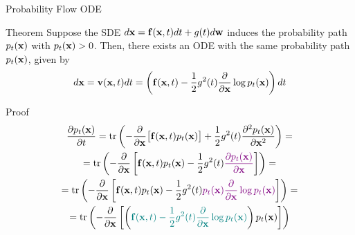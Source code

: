 \documentclass{beamer}
\renewcommand{\nextonslide}[1]{#1}
\begin{document}
\begin{frame}{Probability Flow ODE}
	\vspace{-0.3cm}
	\begin{block}{Theorem}
		Suppose the SDE $d\mathbf{x} = \mathbf{f}(\mathbf{x}, t) dt + g(t) d \mathbf{w}$ induces the probability path $p_t(\mathbf{x})$ with $p_t(\mathbf{x}) > 0$.
		Then, there exists an ODE with the same probability path $p_t(\mathbf{x})$, given by
		\vspace{-0.3cm}
		\[
			d\mathbf{x} = \mathbf{v}(\mathbf{x}, t) dt = \left(\mathbf{f}(\mathbf{x}, t) -\frac{1}{2} g^2(t) \frac{\partial}{\partial \mathbf{x}} \log p_t(\mathbf{x}) \right) dt
		\]
		\vspace{-0.7cm}
	\end{block}
	\begin{block}{Proof}
 		\vspace{-0.7cm}
 		{\small
 		\begin{multline*}
 			\frac{\partial p_t(\bx)}{\partial t} = \tr\left( - \frac{\partial}{\partial \bx} \bigl[ \bff(\bx, t) p_t(\bx)\bigr] + \frac{1}{2} g^2(t) \frac{\partial^2 p_t(\bx)}{\partial \bx^2} \right) 
			\nextonslide{= \\ = \tr\left( - \frac{\partial}{\partial \bx} \left[ \bff(\bx, t) p_t(\bx) - \frac{1}{2} g^2(t) {\color{violet}\frac{\partial p_t(\bx)}{\partial \bx}} \right]  \right)}
			\nextonslide{ = \\ =  \tr\left( - \frac{\partial}{\partial \bx} \left[ \bff(\bx, t) p_t(\bx) - \frac{1}{2} g^2(t) {\color{violet}p_t(\bx) \frac{\partial}{\partial \bx} \log p_t(\bx)} \right]  \right)}
			\nextonslide{= \\ =  \tr\left( - \frac{\partial}{\partial \bx} \left[ \left( {\color{teal}\bff(\bx, t) - \frac{1}{2} g^2(t) \frac{\partial}{\partial \bx} \log p_t(\bx)}\right) p_t(\bx) \right]  \right)}
 		\end{multline*}
 		}
 	\end{block}
\end{frame}
\end{document}
